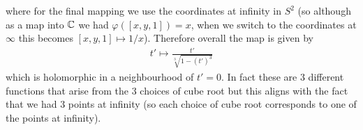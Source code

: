 where for the final mapping we use the coordinates at infinity in $S^2$ (so although as a map into $\mathbb{C}$ we had $\varphi([x, y, 1]) = x$, when we switch to the coordinates at $\infty$ this becomes $[x, y, 1] \mapsto 1/x$). Therefore overall the map is given by 
\begin{align*}
    t' \mapsto \frac{t'}{\sqrt[3]{1 - (t')^3}}
\end{align*}
which is holomorphic in a neighbourhood of $t' = 0$. In fact these are 3 different functions that arise from the 3 choices of cube root but this aligns with the fact that we had 3 points at infinity (so each choice of cube root corresponds to one of the points at infinity).



